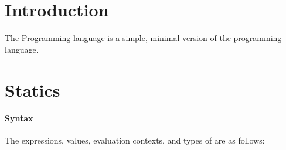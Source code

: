 \documentclass[10pt]{scrartcl}
\begin{document}
\author{Amin TImany}
\title{\TheLang{}}

\maketitle

\section{Introduction}
\label{sec:intro}
The Programming language \TheLang{} is a simple, minimal version of the \ML{} programming language.

\section{Statics}
\label{sec:statics}

\paragraph{Syntax}
The expressions, values, evaluation contexts, and types of \TheLang{} are as follows:
\end{document}
